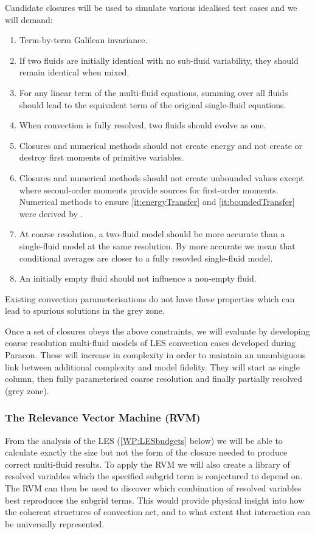 \documentclass[11pt,a4paper]{article}
\begin{document}
Candidate closures will be used to simulate various idealised test cases and we will demand:
\begin{enumerate}
\item Term-by-term Galilean invariance.
\item If two fluids are initially identical with no sub-fluid variability, they should remain identical when mixed.
\item For any linear term of the multi-fluid equations, summing over all fluids should lead to the equivalent term of the original single-fluid equations.
\item  When convection is fully resolved, two fluids should evolve as one.
\item\label{it:energyTransfer} Closures and numerical methods should not create energy and not create or destroy first moments of primitive variables.
\item\label{it:boundedTransfer} Closures and numerical methods should not create unbounded values except where second-order moments provide sources for first-order moments.  Numerical methods to ensure \ref{it:energyTransfer} and \ref{it:boundedTransfer} were derived by \cite{MWH20}.
\item At coarse resolution, a two-fluid model should be more accurate than a single-fluid model at the same resolution. By more accurate we mean that conditional averages are closer to a fully resovled single-fluid model.
\item An initially empty fluid should not influence a non-empty fluid.
\end{enumerate}
Existing convection parameterisations do not have these properties which can lead to spurious solutions in the grey zone.

Once a set of closures obeys the above constraints, we will evaluate by developing coarse resolution multi-fluid models of LES convection cases developed during Paracon. These will increase in complexity in order to maintain an unambiguous link between additional complexity and model fidelity. They will start as single column, then fully parameterised coarse resolution and finally partially resolved (grey zone). 

\subsubsection*{The Relevance Vector Machine (RVM)}

From the analysis of the LES (\ref{WP:LESbudgets} below) we will be able to calculate exactly the size but not the form of the closure needed to produce correct multi-fluid results. To apply the RVM we will also create a library of resolved variables which the specified subgrid term is conjectured to depend on. The RVM can then be used to discover which combination of resolved variables best reproduces the subgrid terms. This would provide physical insight into how the coherent structures of convection act, and to what extent that interaction can be universally represented.
\end{document}

